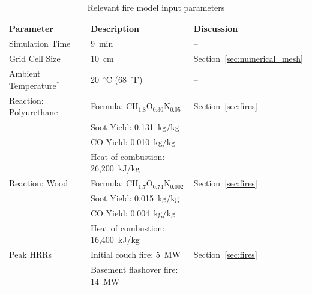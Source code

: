 \documentclass[12pt,oneside]{book}
\renewcommand{\C}{\mbox{C}}
\renewcommand{\H}{\mbox{H}}
\renewcommand{\O}{\mbox{O}}
\newcommand{\N}{\mbox{N}}
\begin{document}
\begin{table}[!ht]
\caption[Relevant fire model input parameters]{Relevant fire model input parameters}
\begin{tabular}{lll}
\toprule
Parameter                                    &  Description                                  &  Discussion                        \\
\midrule
Simulation Time                              &  9~min                                        &  --                                \\
Grid Cell Size                               &  10~cm                                        &  Section~\ref{sec:numerical_mesh}  \\
Ambient Temperature$^*$                      &  20~$^{\circ}$C (68~$^{\circ}$F)              &  --                                \\
Reaction: Polyurethane~\cite{SFPE:Tewarson}  &  Formula: $\C\H_{1.8}\O_{0.30}\N_{0.05}$      &  Section~\ref{sec:fires}           \\
                                             &  Soot Yield: 0.131~$\mathrm{kg}/\mathrm{kg}$  &                                    \\
                                             &  CO Yield: 0.010~$\mathrm{kg}/\mathrm{kg}$    &                                    \\
                                             &  Heat of combustion: 26,200~kJ/kg             &                                    \\
Reaction: Wood~\cite{SFPE:Tewarson}          &  Formula: $\C\H_{1.7}\O_{0.74}\N_{0.002}$     &  Section~\ref{sec:fires}           \\
                                             &  Soot Yield: 0.015~$\mathrm{kg}/\mathrm{kg}$  &                                    \\
                                             &  CO Yield: 0.004~$\mathrm{kg}/\mathrm{kg}$    &                                    \\
                                             &  Heat of combustion: 16,400~kJ/kg             &                                    \\
Peak HRRs                                    &  Initial couch fire: 5~MW                     &  Section~\ref{sec:fires}           \\
                                             &  Basement flashover fire: 14~MW               &                                    \\

\end{tabular}
\end{table}
\end{document}
